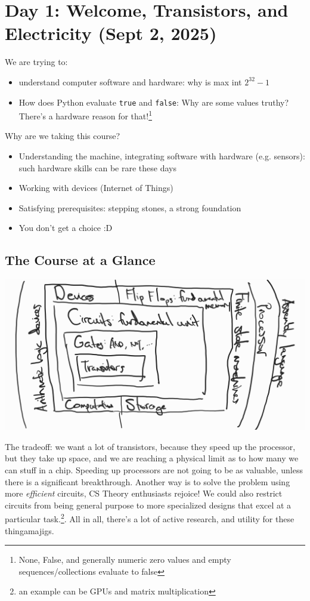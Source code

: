 \section{Day 1: Welcome, Transistors, and Electricity (Sept 2, 2025)}

We are trying to:
\begin{itemize}
    \item understand computer software and hardware: why is max int $2^{32} - 1$
    \item How does Python evaluate \texttt{true} and \texttt{false}: Why are some values truthy? There's a hardware reason for that!\footnote{None, False, and generally numeric zero values and empty sequences/collections evaluate to false}
\end{itemize}

\noindent Why are we taking this course?
\begin{itemize}
    \item Understanding the machine, integrating software with hardware (e.g. sensors): such hardware skills can be rare these days
    \item Working with devices (Internet of Things)
    \item Satisfying prerequisites: stepping stones, a strong foundation
    \item You don't get a choice :D
\end{itemize}

\subsection{The Course at a Glance}
\includegraphics{csc258/figures/courseataglance.jpg}

\begin{remark}
    The tradeoff: we want a lot of transistors, because they speed up the processor, but they take up space, and we are reaching a physical limit as to how many we can stuff in a chip. Speeding up processors are not going to be as valuable, unless there is a significant breakthrough. Another way is to solve the problem using more \textit{efficient} circuits, CS Theory enthusiasts rejoice! We could also restrict circuits from being general purpose to more specialized designs that excel at a particular task.\footnote{an example can be GPUs and matrix multiplication}. All in all, there's a lot of active research, and utility for these thingamajigs.
\end{remark}

